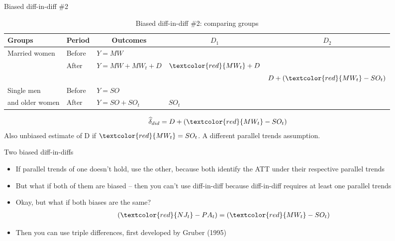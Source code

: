 \documentclass{beamer}
\begin{document}
\begin{frame}{Biased diff-in-diff \#2}

\begin{table}\centering
\scriptsize
		\caption{Biased diff-in-diff \#2: comparing groups}
		\begin{center}
		\begin{tabular}{lll|lc}
		\toprule
		\multicolumn{1}{l}{\textbf{Groups}}&
		\multicolumn{1}{c}{\textbf{Period}}&
		\multicolumn{1}{c}{\textbf{Outcomes}}&
		\multicolumn{1}{c}{$D_1$}&
		\multicolumn{1}{c}{$D_2$}\\
		\midrule
		Married women & Before & $Y=MW$ \\
		& After & $Y=MW + MW_t + D$ & $\textcolor{red}{MW_t}+D$\\
		\midrule
		& & & & $D + (\textcolor{red}{MW_t}- SO_t)$ \\
		\midrule
		Single men  & Before & $Y=SO$ \\
		and older women& After & $Y=SO + SO_t$ & $SO_t$\\
		\bottomrule
		\end{tabular}
		\end{center}
	\end{table}

\begin{eqnarray*}
\widehat{\delta}_{did} = D + (\textcolor{red}{MW_t}- SO_t)
\end{eqnarray*}Also unbiased estimate of D if $\textcolor{red}{MW_t} = SO_t$. A different parallel trends assumption.

\end{frame}


\begin{frame}{Two biased diff-in-diffs}

\begin{itemize}

\item If parallel trends of one doesn't hold, use the other, because both identify the ATT under their respective parallel trends
\item But what if both of them are biased -- then you can't use diff-in-diff because diff-in-diff requires at least one parallel trends
\item Okay, but what if both biases are the same?
	\begin{eqnarray*}
	(\textcolor{red}{NJ_t} -PA_t) = (\textcolor{red}{MW_t} - SO_t)
	\end{eqnarray*}
\item Then you can use triple differences, first developed by Gruber (1995)

\end{itemize}

\end{frame}
\end{document}
